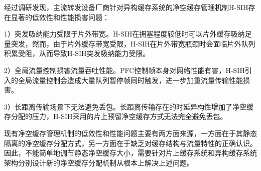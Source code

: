 经过调研发现，主流转发设备厂商针对异构缓存系统的净空缓存管理机制H-SIH存在显著的低效性和性能损害问题：

1）突发吸纳能力受限于片外带宽。H-SIH在拥塞程度较低时可以片外缓存吸纳足量突发，然而，由于片外缓存带宽受限，H-SIH在片外带宽瓶颈时会面临片外队列积累受阻，从而导致H-SIH突发吸纳能力受限。

2）全局流量控制损害流量吞吐性能。PFC控制帧本身对网络性能有害，H-SIH引入的全局流量控制会造成大量队列暂停帧同时触发，进一步加重流量传输性能损害。

3）长距离传输场景下无法避免丢包。长距离传输存在的时延异构性增加了净空缓存分配的压力，H-SIH采用的片上预留净空缓存方式无法完全避免丢包。

现有净空缓存管理机制的低效性和性能问题主要有两方面来源，一方面在于其静态隔离的净空缓存分配方式，另一方面在于缺乏对缓存结构与流量特性的正确认识。因此，不能简单地调节静态净空缓存大小，需要针对片上缓存系统和异构缓存系统架构分别设计新的净空缓存分配机制从根本上解决上述问题。





